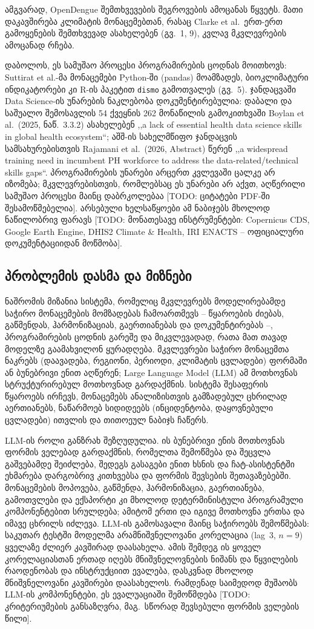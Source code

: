 \documentclass[11pt,a4paper]{article}
\newcommand{\enquote}[1]{,,#1``}
\newcommand{\todo}[1]{\textcolor{red!70!black}{[TODO: #1]}}
\begin{document}
ამგვარად, OpenDengue შემთხვევების შეგროვების ამოცანას წყვეტს. მათი
დაკავშირება კლიმატის მონაცემებთან, რასაც Clarke et al.\ ერთ-ერთ გამოყენების
შემთხვევად ასახელებენ (გვ.~1, 9), კვლავ მკვლევრების ამოცანად რჩება.

დაბოლოს, ეს სამუშაო პროცესი პროგრამირების ცოდნას მოითხოვს: Suttirat et al.-მა
მონაცემები Python-ში (pandas) მოამზადეს, ბიოკლიმატური ინდიკატორები კი R-ის
პაკეტით \texttt{dismo} გამოთვალეს (გვ.~5). ჯანდაცვაში Data Science-ის უნარების
ნაკლებობა დოკუმენტირებულია: დაბალი და საშუალო შემოსავლის 54 ქვეყნის 262
მონაწილის გამოკითხვაში Boylan et al.\ (2025, ნაწ.~3.3.2) ასახელებენ \enquote{a
lack of essential health data science skills in global health ecosystem}; აშშ-ის
სახელმწიფო ჯანდაცვის სამსახურებისთვის Rajamani et al.\ (2026, Abstract) წერენ
\enquote{a widespread training need in incumbent PH workforce to address the
data-related/technical skills gaps}. პროგრამირების უნარები არცერთ კვლევაში ცალკე
არ იზომება; მკვლევრებისთვის, რომლებსაც ეს უნარები არ აქვთ, აღწერილი სამუშაო
პროცესი მაინც დაბრკოლებაა \todo{ციტატები PDF-ში შესამოწმებელია}.
არსებული ხელსაწყოები ამ ნაბიჯებს მხოლოდ ნაწილობრივ ფარავს
\todo{მონათესავე ინსტრუმენტები: Copernicus CDS, Google Earth Engine, DHIS2 Climate \& Health, IRI ENACTS -- ოფიციალური დოკუმენტაციიდან მოწმობა}.

\subsection{პრობლემის დასმა და მიზნები}

ნაშრომის მიზანია სისტემა, რომელიც მკვლევრებს მოდელირებამდე საჭირო
მონაცემების მომზადებას ჩამოართმევს -- წყაროების ძიებას, გაწმენდას,
ჰარმონიზაციას, გაერთიანებას და დოკუმენტირებას --, პროგრამირების ცოდნის გარეშე
და მიკვლევადად, რათა მათ თავად მოდელზე გაამახვილონ ყურადღება. მკვლევრები
საჭირო მონაცემთა ნაკრებს (დაავადება, რეგიონი, პერიოდი, კლიმატის ცვლადები)
ფორმაში ან ბუნებრივი ენით აღწერენ; Large Language Model (LLM) ამ მოთხოვნას
სტრუქტურირებულ მოთხოვნად გარდაქმნის. სისტემა შესაფერის წყაროებს ირჩევს,
მონაცემებს ანალიზისთვის გამზადებულ ცხრილად აერთიანებს, ნაწარმოებ სიდიდეებს
(ინციდენტობა, დაყოვნებული ცვლადები) ითვლის და თითოეულ ნაბიჯს ჩაწერს.

LLM-ის როლი განზრახ შეზღუდულია. ის ბუნებრივი ენის მოთხოვნას ფორმის ველებად
გარდაქმნის, რომელთა შემოწმება და შეცვლა გაშვებამდე შეიძლება, შედეგს გასაგები
ენით ხსნის და ჩატ-ასისტენტში ეხმარება დარგობრივ კითხვებსა და ფორმის
შევსების შეთავაზებებში. მონაცემების მოპოვება, გაწმენდა, ჰარმონიზაცია,
გაერთიანება, გამოთვლები და ექსპორტი კი მხოლოდ დეტერმინისტული პროგრამული
კომპონენტებით სრულდება; ამიტომ ერთი და იგივე მოთხოვნა ერთსა და იმავე ცხრილს
იძლევა. LLM-ის გამოსავალი მაინც საჭიროებს შემოწმებას: საკუთარ ტესტში მოდელმა
არამნიშვნელოვანი კორელაცია (lag~3, $n = 9$) ყველაზე ძლიერ კავშირად დაასახელა.
ამის შემდეგ ის ყოველ კორელაციასთან ერთად იღებს მნიშვნელოვნების ნიშანს და
წყვილების რაოდენობას და ინსტრუქციით ევალება, დასკვნად მხოლოდ მნიშვნელოვანი
კავშირები დაასახელოს. რამდენად საიმედოდ მუშაობს LLM-ის კომპონენტები, ეს ევალუაციაში
შემოწმდება \todo{კრიტერიუმების განსაზღვრა, მაგ.\ სწორად შევსებული ფორმის ველების წილი}.
\end{document}

